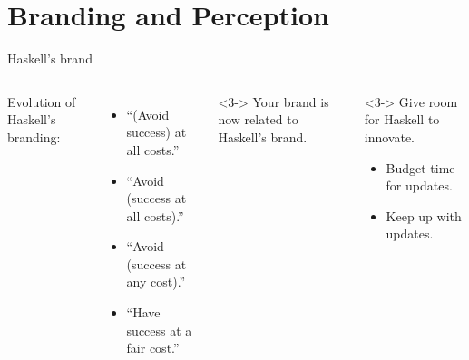 \documentclass[aspectratio=169,ignorenonframetext]{beamer}
\begin{document}
\section{Branding and Perception}

\begin{frame}{Haskell's brand}
	\begin{columns}
		Evolution of Haskell's branding:
		\begin{itemize}
			\item<1-> ``(Avoid success) at all costs.''
			\item<2-> ``Avoid (success at all costs).''
			\item<2-> ``Avoid (success at any cost).''
			\item<2-> ``Have success at a fair cost.''
		\end{itemize}
		\begin{exampleblock}<3->{}
			Your brand is now related to Haskell's brand.
		\end{exampleblock}
		\begin{exampleblock}<3->{}
			Give room for Haskell to innovate.
			\begin{itemize}
				\item Budget time for updates.
				\item Keep up with updates.
			\end{itemize}
		\end{exampleblock}
	\end{columns}
\end{frame}
\end{document}
